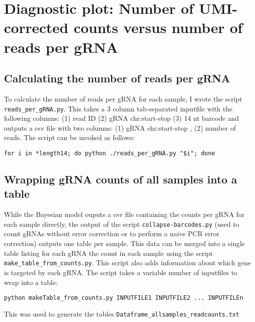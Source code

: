 \section{Diagnostic plot: Number of UMI-corrected counts versus number of reads per gRNA}
\label{subsec:Diagnostic_plot Counts vs reads}

\subsection{Calculating the number of reads per gRNA}

To calculate the number of reads per gRNA for each sample, I wrote the script \verb|reads_per_gRNA.py|. This takes a 3 column tab-separated inputfile with the following columns: (1) read ID (2) gRNA chr:start-stop (3) 14 nt barcode and outputs a csv file with two columns: (1) gRNA chr:start-stop , (2) number of reads. The script can be invoked as follows:

\begin{small}\begin{lstlisting}
for i in *length14; do python ./reads_per_gRNA.py "$i"; done
\end{lstlisting}\end{small}

\subsection{Wrapping gRNA counts of all samples into a table}

While the Bayesian model ouputs a csv file containing the counts per gRNA for each sample directly, the output of the script \verb|collapse-barcodes.py| (used to count gRNAs without error correction or to perform a naive PCR error correction) outputs one table per sample. This data can be merged into a single table listing for each gRNA the count in each sample using the script \verb|make_table_from_counts.py|. This script also adds information about which gene is targeted by each gRNA. The script takes a variable number of inputfiles to wrap into a table:

\begin{small}\begin{lstlisting}
python makeTable_from_counts.py INPUTFILE1 INPUTFILE2 ... INPUTFILEn
\end{lstlisting}\end{small}

This was used to generate the tables \verb|Dataframe_allsamples_readcounts.txt|  \verb||  \verb|| 

